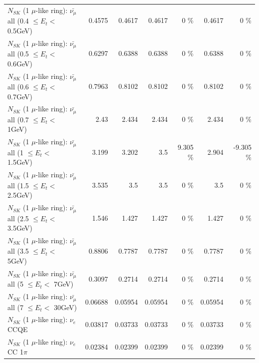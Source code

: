 \begin{table}
\begin{tabular}{| l | r | r | r  r | r  r |}
 $N_{SK}$ (1 $\mu$-like ring): $\bar{\nu_{\mu}}$ all (0.4 $\leq E_{t} <$ 0.5GeV) &          0.4575 &          0.4617 &          0.4617 &        0 \%  &          0.4617 &        0 \%  \\ 
 $N_{SK}$ (1 $\mu$-like ring): $\bar{\nu_{\mu}}$ all (0.5 $\leq E_{t} <$ 0.6GeV) &          0.6297 &          0.6388 &          0.6388 &        0 \%  &          0.6388 &        0 \%  \\ 
 $N_{SK}$ (1 $\mu$-like ring): $\bar{\nu_{\mu}}$ all (0.6 $\leq E_{t} <$ 0.7GeV) &          0.7963 &          0.8102 &          0.8102 &        0 \%  &          0.8102 &        0 \%  \\ 
   $N_{SK}$ (1 $\mu$-like ring): $\bar{\nu_{\mu}}$ all (0.7 $\leq E_{t} <$ 1GeV) &            2.43 &           2.434 &           2.434 &        0 \%  &           2.434 &        0 \%  \\ 
   $N_{SK}$ (1 $\mu$-like ring): $\bar{\nu_{\mu}}$ all (1 $\leq E_{t} <$ 1.5GeV) &           3.199 &           3.202 &             3.5 &    9.305 \%  &           2.904 &   -9.305 \%  \\ 
 $N_{SK}$ (1 $\mu$-like ring): $\bar{\nu_{\mu}}$ all (1.5 $\leq E_{t} <$ 2.5GeV) &           3.535 &             3.5 &             3.5 &        0 \%  &             3.5 &        0 \%  \\ 
 $N_{SK}$ (1 $\mu$-like ring): $\bar{\nu_{\mu}}$ all (2.5 $\leq E_{t} <$ 3.5GeV) &           1.546 &           1.427 &           1.427 &        0 \%  &           1.427 &        0 \%  \\ 
   $N_{SK}$ (1 $\mu$-like ring): $\bar{\nu_{\mu}}$ all (3.5 $\leq E_{t} <$ 5GeV) &          0.8806 &          0.7787 &          0.7787 &        0 \%  &          0.7787 &        0 \%  \\ 
     $N_{SK}$ (1 $\mu$-like ring): $\bar{\nu_{\mu}}$ all (5 $\leq E_{t} <$ 7GeV) &          0.3097 &          0.2714 &          0.2714 &        0 \%  &          0.2714 &        0 \%  \\ 
    $N_{SK}$ (1 $\mu$-like ring): $\bar{\nu_{\mu}}$ all (7 $\leq E_{t} <$ 30GeV) &         0.06688 &         0.05954 &         0.05954 &        0 \%  &         0.05954 &        0 \%  \\ 
\hline
\hline
\hline
                                      $N_{SK}$ (1 $\mu$-like ring): $\nu_e$ CCQE &         0.03817 &         0.03733 &         0.03733 &        0 \%  &         0.03733 &        0 \%  \\ 
                                 $N_{SK}$ (1 $\mu$-like ring): $\nu_e$ CC 1$\pi$ &         0.02384 &         0.02399 &         0.02399 &        0 \%  &         0.02399 &        0 \%  \\ 

\end{tabular}
\end{table}
